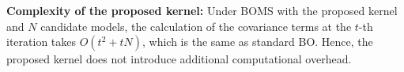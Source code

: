 \vspace{1mm}
\noindent\textbf{Complexity of the proposed kernel:} Under BOMS with the proposed kernel and $N$ candidate models, the calculation of the covariance terms at the $t$-th iteration takes $O(t^2+tN)$, which is the same as standard BO. Hence, the proposed kernel does not introduce additional computational overhead.

\begin{comment}
    \begin{prop}
\label{prop:model_dis}
Given two policies ${\pi}_i$ and ${\pi}_j$ which are learned from models ${M_i}$ and ${M_j}$ respectively. Let ${L}$ be the Lipschitz constant and $\epsilon_u(\pi)= \displaystyle\mathop{\mathbb{E}}_{ (s,a)\sim\rho^\pi} \left[u(s,a)\right]$, where $\rho^\pi$ is the discounted state-action probability distribution under policy $\pi$, and let $\mathop{\mathbb{E}}$ be a shorthand for $\displaystyle \mathop{\mathbb{E}}_{\scriptstyle s\sim\omega, a\sim{\pi}_i, \atop \scriptstyle s'_1\sim \widetilde{M_i}(s,a), s'_2\sim \widetilde{M_j}(s,a)}$,  we have: 
\begin{align*}
    &J^{{\pi}_i}_{M^*}(\omega) - J^{{\pi}_j}_{M^*}(\omega) \le  \\
    &\frac{1}{1-\gamma} \mathop{\mathds{E}} \Big[ \gamma L\norm\big{s'_1 - s'_2}_1 + \big| r_i(s,a)-r_j(s,a)\big| \Big] + 2\lambda \epsilon_u(\pi_\beta) \\
    & + \Big( J^{{\pi}_i}_{M^*}(\omega)-J^{\pi_\beta}_{M^*}(\omega) \Big)
\end{align*}
\end{prop}
\end{comment}




